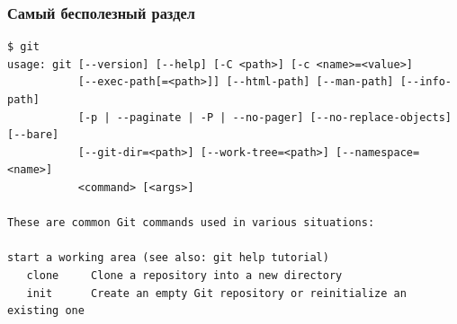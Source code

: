\documentclass[pdf,russian]{beamer}
\begin{document}
\begin{frame}[fragile]
    \frametitle{Самый бесполезный раздел}
    \pause
    \center
    \onslide<+->
    \begin{Verbatim}[fontsize=\relsize{-3}]
$ git
usage: git [--version] [--help] [-C <path>] [-c <name>=<value>]
           [--exec-path[=<path>]] [--html-path] [--man-path] [--info-path]
           [-p | --paginate | -P | --no-pager] [--no-replace-objects] [--bare]
           [--git-dir=<path>] [--work-tree=<path>] [--namespace=<name>]
           <command> [<args>]

These are common Git commands used in various situations:

start a working area (see also: git help tutorial)
   clone     Clone a repository into a new directory
   init      Create an empty Git repository or reinitialize an existing one


\end{Verbatim}
\end{frame}
\end{document}
